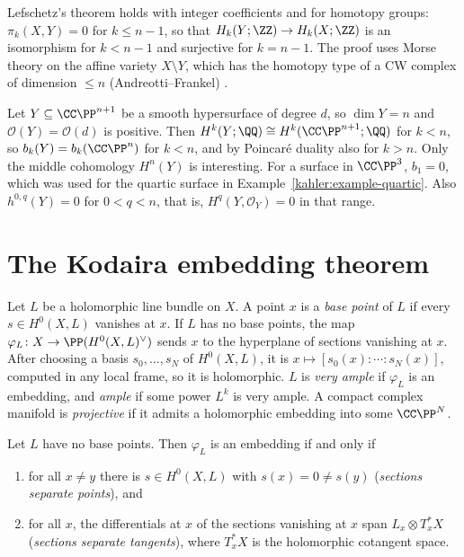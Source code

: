 \begin{remark}\label{kodaira:remark-lefschetz-integral}
Lefschetz's theorem holds with integer coefficients and for homotopy groups: $\pi_k(X, Y) = 0$ for $k \leq n - 1$, so that
$H_k(Y; \ZZ) \to H_k(X; \ZZ)$ is an isomorphism for $k < n - 1$ and surjective for $k = n - 1$. The proof uses Morse theory on the affine
variety $X \setminus Y$, which has the homotopy type of a CW complex of dimension $\leq n$ (Andreotti--Frankel) \cite[Section 7]{milnor-morse}.
\end{remark}

\begin{example}\label{kodaira:example-hypersurfaces}
Let $Y \subseteq \CC\PP^{n+1}$ be a smooth hypersurface of degree $d$, so $\dim Y = n$ and $\mathcal{O}(Y) = \mathcal{O}(d)$ is positive. Then
$H^k(Y; \QQ) \cong H^k(\CC\PP^{n+1}; \QQ)$ for $k < n$, so $b_k(Y) = b_k(\CC\PP^n)$ for $k < n$, and by Poincar\'e duality also for $k > n$.
Only the middle cohomology $H^n(Y)$ is interesting. For a surface in $\CC\PP^3$, $b_1 = 0$,
which was used for the quartic surface in Example~\ref{kahler:example-quartic}. Also $h^{0,q}(Y) = 0$ for $0 < q < n$, that is,
$H^q(Y, \mathcal{O}_Y) = 0$ in that range.
\end{example}

\section{The Kodaira embedding theorem}\label{kodaira:section-embedding}

\begin{definition}\label{kodaira:definition-very-ample}
Let $L$ be a holomorphic line bundle on $X$. A point $x$ is a \emph{base point} of $L$ if every $s \in H^0(X, L)$ vanishes at $x$. If $L$ has no
base points, the map $\varphi_L \colon X \to \PP(H^0(X, L)^\vee)$ sends $x$ to the hyperplane of sections vanishing at $x$. After choosing a
basis $s_0, \ldots, s_N$ of $H^0(X, L)$, it is $x \mapsto [s_0(x) : \cdots : s_N(x)]$, computed in any local frame, so it is holomorphic. $L$ is
\emph{very ample} if $\varphi_L$ is an embedding, and \emph{ample} if some power $L^k$ is very ample. A compact complex manifold is
\emph{projective} if it admits a holomorphic embedding into some $\CC\PP^N$.
\end{definition}

\begin{lemma}\label{kodaira:lemma-embedding-criterion}
Let $L$ have no base points. Then $\varphi_L$ is an embedding if and only if
\begin{enumerate}
\item for all $x \neq y$ there is $s \in H^0(X, L)$ with $s(x) = 0 \neq s(y)$ (\emph{sections separate points}), and
\item for all $x$, the differentials at $x$ of the sections vanishing at $x$ span $L_x \otimes T^{*}_xX$ (\emph{sections separate tangents}),
where $T^*_xX$ is the holomorphic cotangent space.
\end{enumerate}
\end{lemma}

